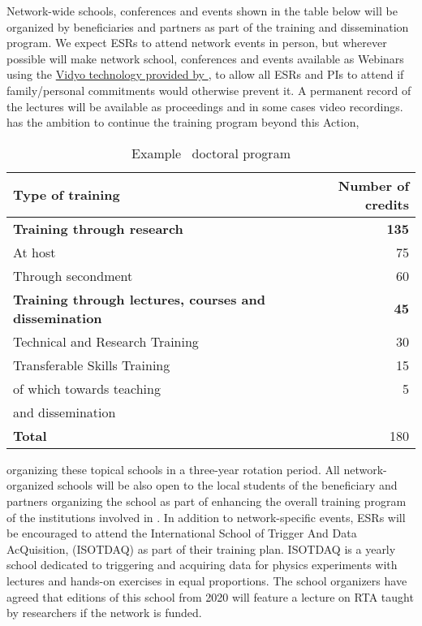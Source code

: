 Network-wide schools, conferences and events shown in the table below will be organized by \acronym beneficiaries and partners as part of the training and dissemination program. 
We expect ESRs to attend network events in person, but wherever possible will make network school, conferences and events available as Webinars using the \href{http://information-technology.web.cern.ch/services/fe/vidyo}{Vidyo technology provided by \cernentity}, to allow all \acronym ESRs and PIs to attend if family/personal commitments would otherwise prevent it. 
A permanent record of the lectures will be available as proceedings and in some cases video recordings. 
\acronym has the ambition to continue the training program beyond this Action, 
\begin{wraptable}{l}{0.45\textwidth}
    \vspace{-2mm}
	\caption{Example \acronym\ doctoral program\label{tab:docProg}
	}\vspace{4mm}
	\small
	\begin{tabular}{p{50mm}r}
		\midrule
		Type of training & Number of credits \tabularnewline\midrule
		\textbf{Training through research}  & \textbf{135} \tabularnewline
		\hspace{5mm}At host & 75 \tabularnewline
		\hspace{5mm}Through secondment  & 60 \tabularnewline\midrule
		\textbf{Training through lectures, courses and dissemination} &  \textbf{45} \tabularnewline
		\hspace{5mm}Technical and Research Training & 30 \tabularnewline
		\hspace{5mm}Transferable Skills Training & 15 \tabularnewline
		\hspace{10mm}of which towards teaching & 5\tabularnewline
        \hspace{10mm}and dissemination & \tabularnewline
		\textbf{Total} &  180 \tabularnewline
		\bottomrule
	\end{tabular}
    \vspace{-2mm}
\end{wraptable}
organizing these topical schools in a three-year rotation period. All network-organized schools will be also open to the local students of the beneficiary and partners organizing the school
as part of enhancing the overall training program of the institutions involved in \acronym.
In addition to network-specific events, ESRs will be encouraged to attend the International School of Trigger And Data AcQuisition, (ISOTDAQ) as part of their training plan. 
ISOTDAQ is a yearly school dedicated to triggering and acquiring data for physics experiments with lectures and hands-on exercises in equal proportions. 
The school organizers have agreed that editions of this school from 2020 will feature a lecture on RTA taught by \acronym researchers if the network is funded. 

